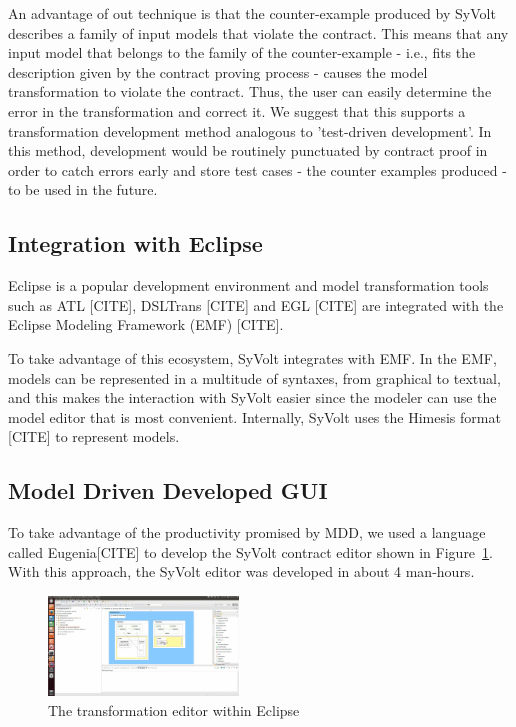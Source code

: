 An advantage of out technique is that the counter-example produced by SyVolt
describes a family of input models that violate the contract. This means that
any input model that belongs to the family of the counter-example - i.e., fits
the description given by the contract proving process - causes the model
transformation to violate the contract.  Thus, the user can easily determine the error in the
transformation and correct it. We suggest that this supports a transformation
development method analogous to 'test-driven development'. In this method,
development would be routinely punctuated by contract proof in order to catch
errors early and store test cases - the counter examples produced - to be used
in the future.


\subsection{Integration with Eclipse}

Eclipse is a popular development environment and model transformation
tools such as ATL [CITE], DSLTrans [CITE] and EGL [CITE] are integrated with the
Eclipse Modeling Framework (EMF) [CITE].

To take advantage of this ecosystem, SyVolt integrates with EMF.
In the EMF, models can be represented in a multitude of syntaxes, from graphical
to textual, and this makes the interaction with SyVolt easier since the modeler
can use the model editor that is most convenient. Internally, SyVolt uses 
the Himesis format [CITE] to represent models.

\subsection{Model Driven Developed GUI}
\label{sec:mdd_gui}

To take advantage of the productivity promised by MDD, we used a language called
Eugenia[CITE] to develop the SyVolt contract editor shown in
Figure~\ref{fig:eclipse_frontend}.
With this approach, the SyVolt editor was developed in about 4 man-hours.

\begin{figure}
\centering
\includegraphics[width=0.45\textwidth]{figures/eclipse_frontend}
\caption{The transformation editor within Eclipse}
\label{fig:eclipse_frontend}
\end{figure}




 